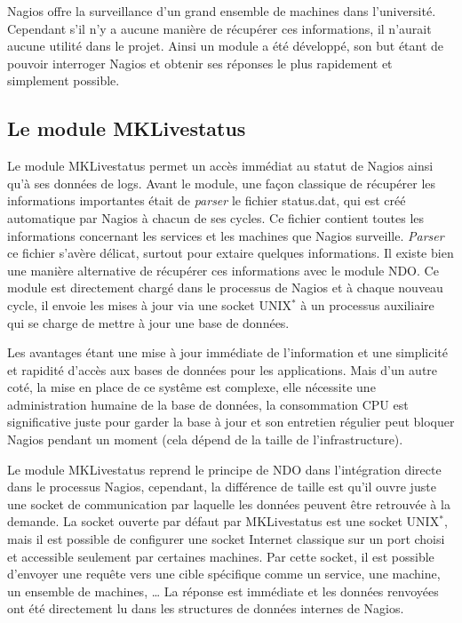 Nagios offre la surveillance d'un grand ensemble de machines dans l'universit\'e. 
Cependant s'il n'y a aucune mani\`ere de r\'ecup\'erer ces informations, il n'aurait aucune utilit\'e dans le projet.
Ainsi un module a \'et\'e d\'evelopp\'e, son but \'etant de pouvoir interroger Nagios et obtenir ses r\'eponses le plus rapidement et simplement possible.

\subsection{Le module MKLivestatus}
\label{section:moduleMKLivestatus}

Le module MKLivestatus permet un acc\`es imm\'ediat au statut de Nagios ainsi qu'\`a ses donn\'ees de logs.
Avant le module, une fa\c{c}on classique de r\'ecup\'erer les informations importantes \'etait de \textit{parser} le fichier \textsf{status.dat}, qui est cr\'e\'e automatique par Nagios \`a chacun de ses cycles.
Ce fichier contient toutes les informations concernant les services et les machines que Nagios surveille.
\textit{Parser} ce fichier s'av\`ere d\'elicat, surtout pour extaire quelques informations.
Il existe bien une mani\`ere alternative de r\'ecup\'erer ces informations avec le module NDO.
Ce module est directement charg\'e dans le processus de Nagios et \`a chaque nouveau cycle, il envoie les mises \`a jour via une socket UNIX$^*$ \`a un processus auxiliaire qui se charge de mettre \`a jour une base de donn\'ees.

Les avantages \'etant une mise \`a jour imm\'ediate de l'information et une simplicit\'e et rapidit\'e d'acc\`es aux bases de donn\'ees pour les applications.
Mais d'un autre cot\'e, la mise en place de ce syst\^eme est complexe, elle n\'ecessite une administration humaine de la base de donn\'ees, la consommation CPU est significative juste pour garder la base \`a jour et son entretien r\'egulier peut bloquer Nagios pendant un moment (cela d\'epend de la taille de l'infrastructure).

Le module MKLivestatus reprend le principe de NDO dans l'int\'egration directe dans le processus Nagios, cependant, la diff\'erence de taille est qu'il ouvre juste une socket de communication par laquelle les donn\'ees peuvent \^etre retrouv\'ee \`a la demande.
La socket ouverte par d\'efaut par MKLivestatus est une socket UNIX$^*$, mais il est possible de configurer une socket Internet classique sur un port choisi et accessible seulement par certaines machines.
Par cette socket, il est possible d'envoyer une requ\^ete vers une cible sp\'ecifique comme un service, une machine, un ensemble de machines, \ldots{}
La r\'eponse est imm\'ediate et les donn\'ees renvoy\'ees ont \'et\'e directement lu dans les structures de donn\'ees internes de Nagios.

